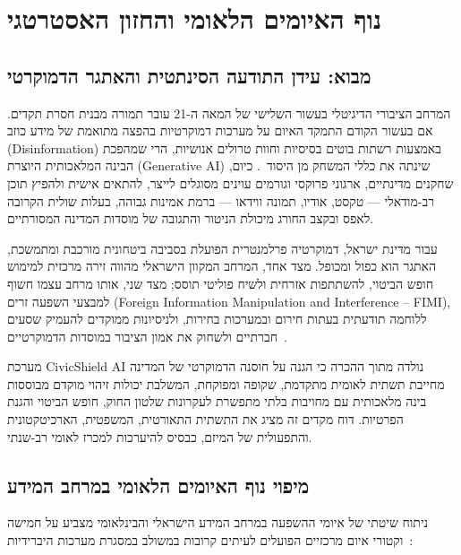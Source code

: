 \chapter{נוף האיומים הלאומי והחזון האסטרטגי}
\label{ch:vision}

\section{מבוא: עידן התודעה הסינתטית והאתגר הדמוקרטי}
\label{sec:vision_intro}

המרחב הציבורי הדיגיטלי בעשור השלישי של המאה ה-21 עובר תמורה מבנית חסרת תקדים. אם בעשור הקודם התמקד האיום על מערכות דמוקרטיות בהפצה מתואמת של מידע כוזב (\textenglish{Disinformation}) באמצעות רשתות בוטים בסיסיות וחוות טרולים אנושיות, הרי שמהפכת הבינה המלאכותית היוצרת (\textenglish{Generative AI}) שינתה את כללי המשחק מן היסוד~\cite{goldstein2023generative}. כיום, שחקנים מדינתיים, ארגוני פרוקסי וגורמים עוינים מסוגלים לייצר, להתאים אישית ולהפיץ תוכן רב-מודאלי --- טקסט, אודיו, תמונה ווידאו --- ברמת אמינות גבוהה, בעלות שולית הקרובה לאפס ובקצב החורג מיכולת הניטור והתגובה של מוסדות המדינה המסורתיים.

עבור מדינת ישראל, דמוקרטיה פרלמנטרית הפועלת בסביבה ביטחונית מורכבת ומתמשכת, האתגר הוא כפול ומכופל. מצד אחד, המרחב המקוון הישראלי מהווה זירה מרכזית למימוש חופש הביטוי, להשתתפות אזרחית ולשיח פוליטי תוסס; מצד שני, אותו מרחב עצמו חשוף למבצעי השפעה זרים (\textenglish{Foreign Information Manipulation and Interference -- FIMI}), ללוחמה תודעתית בעתות חירום ובמערכות בחירות, ולניסיונות ממוקדים להעמיק שסעים חברתיים ולשחוק את אמון הציבור במוסדות הדמוקרטיים~\cite{bennett2018disinformation}.

מערכת \textenglish{CivicShield AI} נולדה מתוך ההכרה כי הגנה על חוסנה הדמוקרטי של המדינה מחייבת תשתית לאומית מתקדמת, שקופה ומפוקחת, המשלבת יכולות זיהוי מוקדם מבוססות בינה מלאכותית עם מחויבות בלתי מתפשרת לעקרונות שלטון החוק, חופש הביטוי והגנת הפרטיות. דוח מקדים זה מציג את התשתית התאורטית, המשפטית, הארכיטקטונית והתפעולית של המיזם, כבסיס להיערכות למכרז לאומי רב-שנתי.

\section{מיפוי נוף האיומים הלאומי במרחב המידע}
\label{sec:threat_landscape}

ניתוח שיטתי של איומי ההשפעה במרחב המידע הישראלי והבינלאומי מצביע על חמישה וקטורי איום מרכזיים הפועלים לעיתים קרובות במשולב במסגרת מערכות היברידיות~\cite{rid2020active}:

